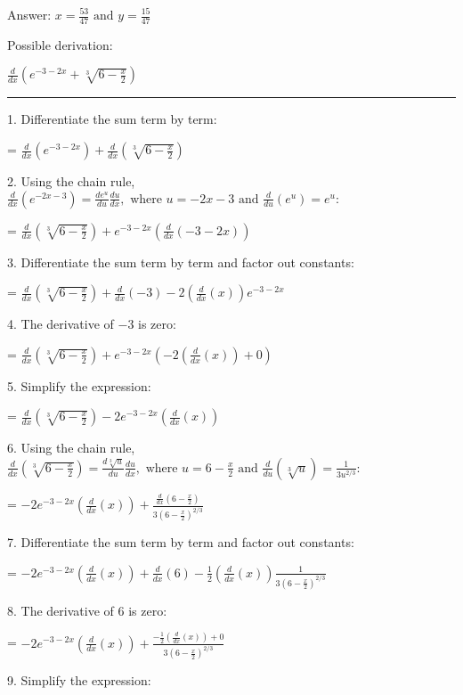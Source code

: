 \documentclass{article}
\begin{document}
Answer: $x=\frac{53}{47}\text{ and }y=\frac{15}{47}$

\pagebreak

Possible derivation:

$\frac{d}{dx}\left(e^{-3-2 x}+\sqrt[3]{6-\frac{x}{2}}\right)$

\hrule

1. Differentiate the sum term by term:

= $\frac{d}{dx}\left(e^{-3-2 x}\right)+\frac{d}{dx}\left(\sqrt[3]{6-\frac{x}{2}}\right)$

2. Using the chain rule, $\frac{d}{dx}\left(e^{-2 x-3}\right)=\frac{de^u}{du} \frac{du}{dx},\text{ where }u=-2 x-3\text{ and }\frac{d\text{}}{du}\left(e^u\right)=e^u:$

= $\frac{d}{dx}\left(\sqrt[3]{6-\frac{x}{2}}\right)+e^{-3-2 x} \left(\frac{d}{dx}(-3-2 x)\right)$

3. Differentiate the sum term by term and factor out constants:

= $\frac{d}{dx}\left(\sqrt[3]{6-\frac{x}{2}}\right)+\frac{d}{dx}(-3)-2 \left(\frac{d}{dx}(x)\right) e^{-3-2 x}$

4. The derivative of $-3$ is zero:

= $\frac{d}{dx}\left(\sqrt[3]{6-\frac{x}{2}}\right)+e^{-3-2 x} \left(-2 \left(\frac{d}{dx}(x)\right)+0\right)$

5. Simplify the expression:

= $\frac{d}{dx}\left(\sqrt[3]{6-\frac{x}{2}}\right)-2 e^{-3-2 x} \left(\frac{d}{dx}(x)\right)$

6. Using the chain rule, $\frac{d}{dx}\left(\sqrt[3]{6-\frac{x}{2}}\right)=\frac{d\sqrt[3]{u}}{du} \frac{du}{dx},\text{ where }u=6-\frac{x}{2}\text{ and }\frac{d\text{}}{du}\left(\sqrt[3]{u}\right)=\frac{1}{3 u^{2/3}}$:

= $-2 e^{-3-2 x} \left(\frac{d}{dx}(x)\right)+\frac{\frac{d}{dx}\left(6-\frac{x}{2}\right)}{3 \left(6-\frac{x}{2}\right)^{2/3}}$

7. Differentiate the sum term by term and factor out constants:

= $-2 e^{-3-2 x} \left(\frac{d}{dx}(x)\right)+\frac{d}{dx}(6)-\frac{1}{2} \left(\frac{d}{dx}(x)\right) \frac{1}{3 \left(6-\frac{x}{2}\right)^{2/3}}$

8. The derivative of $6$ is zero:

= $-2 e^{-3-2 x} \left(\frac{d}{dx}(x)\right)+\frac{-\frac{1}{2} \left(\frac{d}{dx}(x)\right)+0}{3 \left(6-\frac{x}{2}\right)^{2/3}}$

9. Simplify the expression:
\end{document}
